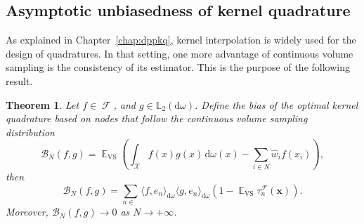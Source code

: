 \documentclass[twoside,11pt]{book}
\newtheorem{theorem}{Theorem}
\numberwithin{theorem}{chapter}
\numberwithin{definition}{chapter}
\numberwithin{proposition}{chapter}
\numberwithin{corollary}{chapter}
\numberwithin{example}{chapter}
\numberwithin{lemma}{chapter}
\numberwithin{assumption}{chapter}
\numberwithin{equation}{chapter}
\numberwithin{figure}{chapter}
\DeclareMathOperator{\VS}{\mathrm{VS}}
\DeclareMathOperator{\EX}{\mathbb{E}}
\DeclareMathOperator{\F}{\mathcal{F}}
\DeclareMathOperator{\X}{\mathcal{X}}
\def\Ltwo{\mathbb{L}_{2}(\mathrm{d} \omega)}
\DeclareMathOperator{\Ns}{\mathbb{N}^{*}}
\newcommand{\pc}[1]{\textcolor{blue}{#1}}
\begin{document}
\subsection{Asymptotic unbiasedness of kernel quadrature}\label{CVS_sec:unbiased_property}
As explained in Chapter~\ref{chap:dppkq}, kernel interpolation is widely used for the design of quadratures.
In that setting, one more advantage of continuous volume sampling is the consistency of its estimator. This is the purpose of the following result.
 \begin{theorem}\label{CVS_thm:EX_VS_integration_error}
Let $f \in \F$, and $g \in \Ltwo$. Define the bias of the optimal kernel quadrature based on nodes that follow the continuous volume sampling distribution
\begin{equation}
\mathcal{B}_{N}(f,g) =  \EX_{\VS} \left( \int_{\X}f(x)g(x)\,\mathrm{d}\omega(x) -  \sum\limits_{i \in N} \hat{w}_{i}f(x_{i}) \right),
\end{equation}
then
\begin{equation}
\mathcal{B}_{N}(f,g) = \sum\limits_{n \in \Ns} \langle f,e_{n} \rangle_{\mathrm{d}\omega} \langle g,e_{n} \rangle_{\mathrm{d}\omega}\left(1- \EX_{\VS}\tau_{n}^{\F}(\bm{x}) \right) .%
\end{equation}
Moreover,
$\mathcal{B}_{N}(f,g) \rightarrow 0$ as $N \rightarrow +\infty$.
\end{theorem}
\end{document}
